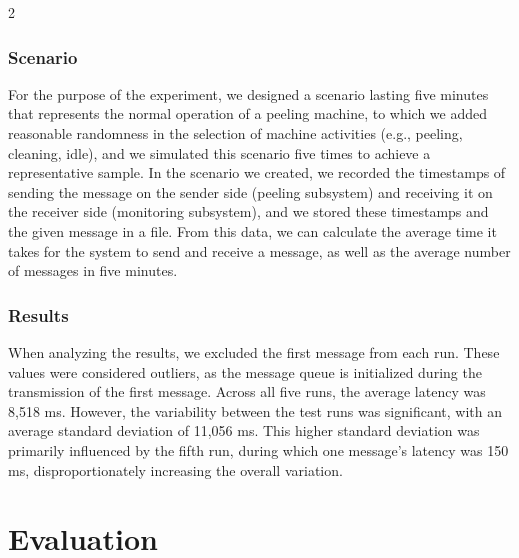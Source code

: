 \documentclass{article}
\begin{document}
\begin{multicols}{2}
\subsubsection{Scenario}
For the purpose of the experiment, we designed a scenario lasting five minutes that represents the normal operation of a peeling machine, to which we added reasonable randomness in the selection of machine activities (e.g., peeling, cleaning, idle), and we simulated this scenario five times to achieve a representative sample. In the scenario we created, we recorded the timestamps of sending the message on the sender side (peeling subsystem) and receiving it on the receiver side (monitoring subsystem), and we stored these timestamps and the given message in a file. From this data, we can calculate the average time it takes for the system to send and receive a message, as well as the average number of messages in five minutes.

\subsubsection{Results}
When analyzing the results, we excluded the first message from each run. These values were considered outliers, as the message queue is initialized during the transmission of the first message. Across all five runs, the average latency was 8,518 ms. However, the variability between the test runs was significant, with an average standard deviation of 11,056 ms. This higher standard deviation was primarily influenced by the fifth run, during which one message's latency was 150 ms, disproportionately increasing the overall variation.

\section{Evaluation}





\end{multicols}
\end{document}
